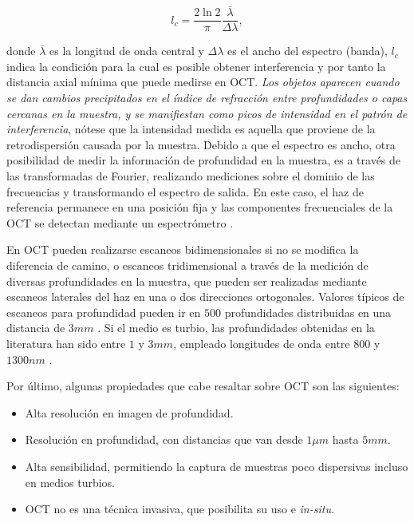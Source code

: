 
\begin{equation}
	\label{eq:l_c}
	l_c = \frac{2\ln 2}{\pi} \frac{\bar{\lambda}}{\Delta \lambda},
\end{equation}

\noindent donde $\bar{\lambda}$ es la longitud de onda central y $\Delta \lambda$ es el ancho del espectro (banda), $l_c$ indica la condición para la cual es posible obtener interferencia y por tanto la distancia axial mínima que puede medirse en OCT. \emph{Los objetos aparecen cuando se dan cambios precipitados en el índice de refracción entre profundidades o capas cercanas en la muestra, y se manifiestan como picos de intensidad en el patrón de interferencia}, nótese que la intensidad medida es aquella que proviene de la retrodispersión causada por la muestra. Debido a que el espectro es ancho, otra posibilidad de medir la información de profundidad en la muestra, es a través de las transformadas de Fourier, realizando mediciones sobre el dominio de las frecuencias y transformando el espectro de salida. En este caso, el haz de referencia permanece en una posición fija y las componentes frecuenciales de la OCT se detectan mediante un espectrómetro \cite{Drexler2015,Brezinski2005}.

En OCT pueden realizarse escaneos bidimensionales si no se modifica la diferencia de camino, o escaneos tridimensional a través de la medición de diversas profundidades en la muestra, que pueden ser realizadas mediante escaneos laterales del haz en una o dos direcciones ortogonales. Valores típicos de escaneos para profundidad pueden ir en $500$ profundidades distribuidas en una distancia de $3mm$ \cite{Tomlins}. Si el medio es turbio, las profundidades obtenidas en la literatura han sido entre $1$ y $3mm$, empleado longitudes de onda entre $800$ y $1300nm$ \cite{Drexler2015}.

Por último, algunas propiedades que cabe resaltar sobre OCT son las siguientes:
\begin{itemize}
	\item Alta resolución en imagen de profundidad.
	\item Resolución en profundidad, con distancias que van desde $1\mu m$ hasta $5mm$.
	\item Alta sensibilidad, permitiendo la captura de muestras poco dispersivas incluso en medios turbios.
	\item OCT no es una técnica invasiva, que posibilita su uso \invivo e \emph{in-situ}.
\end{itemize}

